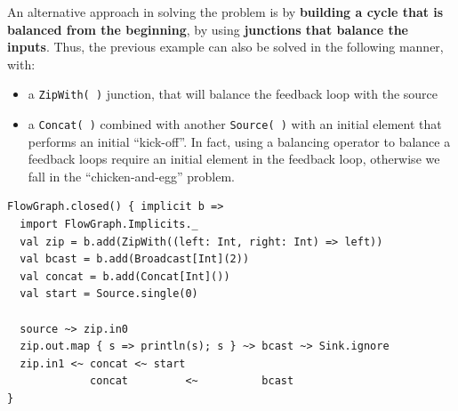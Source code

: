An alternative approach in solving the problem is by \textbf{building a
cycle that is balanced from the beginning}, by using \textbf{junctions
that balance the inputs}. Thus, the previous example can also be solved
in the following manner, with:

\begin{itemize}
\itemsep1pt\parskip0pt
\item
  a \texttt{ZipWith(\ )} junction, that will balance the feedback loop
  with the source
\item
  a \texttt{Concat(\ )} combined with another \texttt{Source(\ )} with
  an initial element that performs an initial ``kick-off''. In fact,
  using a balancing operator to balance a feedback loops require an
  initial element in the feedback loop, otherwise we fall in the
  ``chicken-and-egg'' problem.
\end{itemize}

\begin{verbatim}
FlowGraph.closed() { implicit b =>
  import FlowGraph.Implicits._
  val zip = b.add(ZipWith((left: Int, right: Int) => left))
  val bcast = b.add(Broadcast[Int](2))
  val concat = b.add(Concat[Int]())
  val start = Source.single(0)

  source ~> zip.in0
  zip.out.map { s => println(s); s } ~> bcast ~> Sink.ignore
  zip.in1 <~ concat <~ start
             concat         <~          bcast
}
\end{verbatim}
